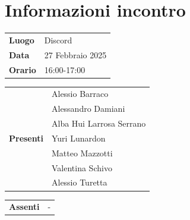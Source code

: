 \section{Informazioni incontro}
\vspace{0.25cm}
\begin{tabular}{p{1.75cm} | l}
    \textbf{Luogo} & Discord\\
    \textbf{Data} & 27 Febbraio 2025\\
    \textbf{Orario} & 16:00-17:00\\
\end{tabular}

\vspace{0.5cm}
\noindent
\begin{tabular}{p{1.75cm} | l}
    \multirow{7}{*}{\textbf{Presenti}}
        & Alessio Barraco\\
        & Alessandro Damiani\\
        & Alba Hui Larrosa Serrano\\
        & Yuri Lunardon\\
        & Matteo Mazzotti\\
        & Valentina Schivo\\
        & Alessio Turetta
\end{tabular}

\vspace{0.5cm}
\noindent
\begin{tabular}{p{1.75cm} | l}
    \multirow{1}{*}{\textbf{Assenti}}
        & -\\
\end{tabular}